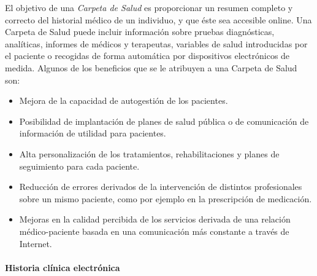 El objetivo de una \textit{Carpeta de Salud} es proporcionar un resumen completo y correcto del historial médico de un individuo, y que éste sea accesible online.
Una Carpeta de Salud puede incluir información sobre pruebas diagnósticas, analíticas, informes de médicos y terapeutas,
 variables de salud introducidas por el paciente o recogidas de forma automática por dispositivos electrónicos de medida.
Algunos de los beneficios que se le atribuyen a una Carpeta de Salud son:
	\begin{itemize}
        \item Mejora de la capacidad de autogestión de los pacientes.
	    \item Posibilidad de implantación de planes de salud pública o de comunicación de información de utilidad para pacientes.
	    \item Alta personalización de los tratamientos, rehabilitaciones y planes de seguimiento para cada paciente.
	    \item Reducción de errores derivados de la intervención de distintos profesionales sobre un mismo paciente, como por ejemplo en la prescripción de medicación.
	    \item Mejoras en la calidad percibida de los servicios derivada de una relación médico-paciente basada en una comunicación más constante a través de Internet.
	\end{itemize}


\paragraph{Historia clínica electrónica}


